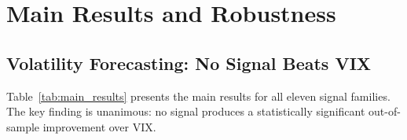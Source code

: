 \documentclass[12pt,a4paper]{article}
\begin{document}
\section{Main Results and Robustness}
\label{sec:results}

\subsection{Volatility Forecasting: No Signal Beats VIX}

Table~\ref{tab:main_results} presents the main results for all eleven signal families. The key finding is unanimous: no signal produces a statistically significant out-of-sample improvement over VIX.
\end{document}
